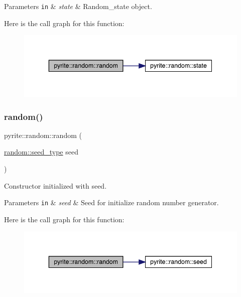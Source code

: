 \begin{DoxyParams}[1]{Parameters}
\mbox{\tt in}  & {\em state} & Random\+\_\+state object. \\
\hline
\end{DoxyParams}
Here is the call graph for this function\+:
\nopagebreak
\begin{figure}[H]
\begin{center}
\leavevmode
\includegraphics[width=343pt]{d2/df9/classpyrite_1_1random_a593c1826bad1b27d489ee55c85da30b3_cgraph}
\end{center}
\end{figure}
\mbox{\label{classpyrite_1_1random_a9f0f5391be20a8fdc3d6009e14dc0bfe}} 
\subsubsection{\texorpdfstring{random()}{random()}\hspace{0.1cm}{\footnotesize\ttfamily [3/5]}}
{\footnotesize\ttfamily pyrite\+::random\+::random (\begin{DoxyParamCaption}\item[{\mbox{\hyperlink{classpyrite_1_1random_a936dc9fd106c9b125ccbf3aa6d525e4b}{random\+::seed\+\_\+type}}}]{seed }\end{DoxyParamCaption})\hspace{0.3cm}{\ttfamily [explicit]}}

Constructor initialized with seed.


\begin{DoxyParams}[1]{Parameters}
\mbox{\tt in}  & {\em seed} & Seed for initialize random number generator. \\
\hline
\end{DoxyParams}
Here is the call graph for this function\+:
\nopagebreak
\begin{figure}[H]
\begin{center}
\leavevmode
\includegraphics[width=343pt]{d2/df9/classpyrite_1_1random_a9f0f5391be20a8fdc3d6009e14dc0bfe_cgraph}
\end{center}
\end{figure}
\mbox{\label{classpyrite_1_1random_ab3ef314958056708117ab37d2dded013}} 
